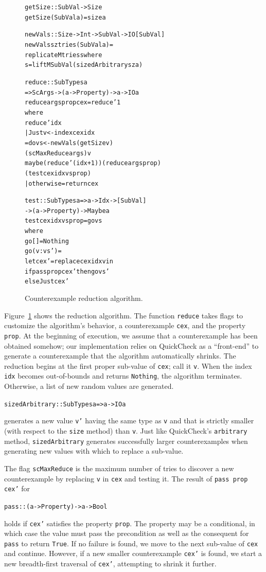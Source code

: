 \documentclass{sigplanconf}
\newenvironment{code}{\begin{alltt}}{\end{alltt}}
\newcommand{\ttp}[1]{\texttt{#1}}
\begin{document}
\begin{figure}[ht]
  \begin{code}
getSize :: SubVal -> Size
getSize (SubVal a) = size a

newVals :: Size -> Int -> SubVal -> IO [SubVal]
newVals sz tries (SubVal a) =
  replicateM tries s where
  s  = liftM SubVal (sizedArbitrary sz a)

reduce :: SubTypes a
  => ScArgs -> (a -> Property) -> a -> IO a
reduce args prop cex = reduce' 1
  where
  reduce' idx
    | Just v <- index cex idx
    = do vs <- newVals (getSize v)
                 (scMaxReduce args) v
         maybe (reduce' (idx+1)) (reduce args prop)
               (test cex idx vs prop)
    | otherwise = return cex

test :: SubTypes a => a -> Idx -> [SubVal]
     -> (a -> Property) -> Maybe a
test cex idx vs prop = go vs
  where
  go []      = Nothing
  go (v:vs') =
    let cex' = replace cex idx v in
    if pass prop cex' then go vs'
      else Just cex'
  \end{code}
  \caption{Counterexample reduction algorithm.\label{fig:reduction}}
\end{figure}

Figure~\ref{fig:reduction} shows the reduction algorithm.  The function
\ttp{reduce} takes flags to customize the algorithm's behavior, a
counterexample \ttp{cex}, and the property \ttp{prop}.  At the beginning of
execution, we assume that a counterexample has been obtained somehow; our
implementation relies on QuickCheck as a ``front-end'' to generate a
counterexample that the algorithm automatically shrinks.  The reduction begins
at the first proper sub-value of \ttp{cex}; call it \ttp{v}.  When the index
\ttp{idx} becomes out-of-bounds and returns \ttp{Nothing}, the algorithm
terminates.  Otherwise, a list of new random values are generated.
%
\begin{code}
sizedArbitrary :: SubTypes a => a -> IO a
\end{code}
%
\noindent
generates a new value \ttp{v'} having the same type as \ttp{v} and that is
strictly smaller (with respect to the \ttp{size} method) than \ttp{v}.  Just
like QuickCheck's \ttp{arbitrary} method, \ttp{sizedArbitrary} generates
successfully larger counterexamples when generating new values with which to
replace a sub-value.

The flag \ttp{scMaxReduce} is the maximum number of tries to discover a new
counterexample by replacing \ttp{v} in \ttp{cex} and testing it.  The result of
\ttp{pass prop cex'} for
%
\begin{code}
pass :: (a -> Property) -> a -> Bool
\end{code}
%
\noindent
holds if \ttp{cex'} satisfies the property \ttp{prop}.  The property may be a
conditional, in which case the value must pass the precondition as well as the
consequent for \ttp{pass} to return \ttp{True}.  If no failure is found, we move
to the next sub-value of \ttp{cex} and continue.  However, if a new smaller
counterexample \ttp{cex'} is found, we start a new breadth-first traversal of
\ttp{cex'}, attempting to shrink it further.
\end{document}
